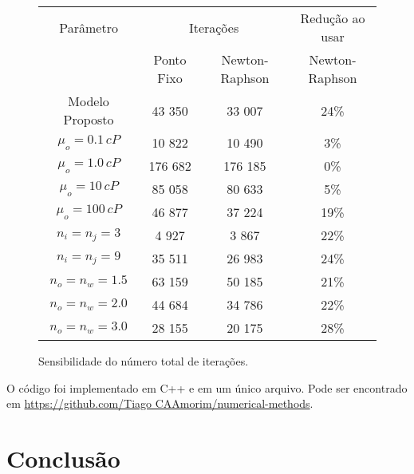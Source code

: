 \documentclass[final,5p]{elsarticle}
\numberwithin{equation}{section}
\begin{document}
        \begin{figure*}
            \caption{Sensibilidade do número total de iterações.}
            \label{tab:sens}
            \begin{center}
                \renewcommand{\arraystretch}{1.2}
                \begin{tabular}{c|cc|c}
                    Parâmetro & \multicolumn{2}{c|}{Iterações}  & Redução ao usar \\
                            & Ponto Fixo      & Newton-Raphson & Newton-Raphson \\
                    \hline
                    Modelo Proposto & 43 350 & 33 007 & 24\% \\
                    \hline
                    $\mu_o = 0.1\,cP$ & 10 822 & 10 490 & 3\% \\
                    $\mu_o = 1.0\,cP$ & 176 682 & 176 185  & 0\% \\
                    $\mu_o = 10\,cP$ & 85 058 & 80 633 & 5\% \\
                    $\mu_o = 100\,cP$ & 46 877 & 37 224 & 19\% \\
                    \hline
                    $n_i = n_j = 3$ & 4 927 & 3 867 & 22\% \\
                    $n_i = n_j = 9$ & 35 511 & 26 983 & 24\% \\
                    \hline
                    $n_o = n_w = 1.5$ & 63 159 & 50 185 & 21\% \\
                    $n_o = n_w = 2.0$ & 44 684 & 34 786 & 22\% \\
                    $n_o = n_w = 3.0$ & 28 155 & 20 175 & 28\%  \\
                \end{tabular}
            \end{center}
        \end{figure*}

        O código foi implementado em C++ e em um único arquivo. Pode ser encontrado em \href{https://github.com/TiagoCAAmorim/numerical-methods/blob/main/12_NewtonRaphson/12_NewtonRaphson.cpp}{https://github.com/Tiago CAAmorim/numerical-methods}.

\section{Conclusão}
\end{document}
